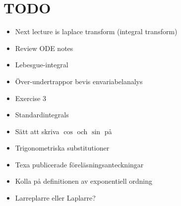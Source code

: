 \section{TODO}\par
\begin{itemize}
  \item Next lecture is laplace transform (integral transform) 
  \item Review ODE notes
  \item Lebesgue-integral
  \item Över-undertrappor bevis envariabelanalys
  \item Exercise 3
  \item Standardintegrals
  \item Sätt att skriva $\cos$ och $\sin$ på
  \item Trigonometriska substitutioner
  \item Texa publicerade föreläsningsanteckningar 
  \item Kolla på definitionen av exponentiell ordning
  \item Larreplarre eller Laplarre?
\end{itemize}
